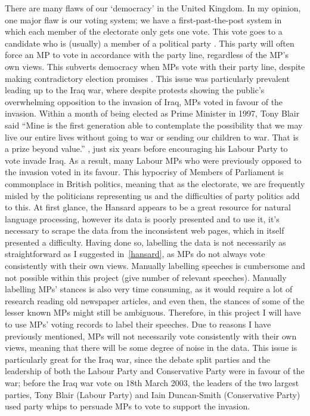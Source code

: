 \documentclass[12pt,a4paper,twoside,openright]{report}
\begin{document}
There are many flaws of our `democracy' in the United Kingdom. In my opinion, one major flaw is our voting system; we have a first-past-the-post system in which each member of the electorate only gets one vote. This vote goes to a candidate who is (usually) a member of a political party \cite{current_mp_parties}. This party will often force an MP to vote in accordance with the party line, regardless of the MP's own views. This subverts democracy when MPs vote with their party line, despite making contradictory election promises \cite{gov_tracker}. This issue was particularly prevalent leading up to the Iraq war, where despite protests \cite{iraq_protests} showing the public's overwhelming opposition to the invasion of Iraq, MPs voted in favour of the invasion. Within a month of being elected as Prime Minister in 1997, Tony Blair said ``Mine is the first generation able to contemplate the possibility that we may live our entire lives without going to war or sending our children to war. That is a prize beyond value.'' \cite{blair_quotes}, just six years before encouraging his Labour Party to vote invade Iraq. As a result, many Labour MPs who were previously opposed to the invasion voted in its favour. This hypocrisy of Members of Parliament is commonplace in British politics, meaning that as the electorate, we are frequently misled by the politicians representing us and the difficulties of party politics add to this.
\newline
\newline
At first glance, the Hansard appears to be a great resource for natural language processing, however its data is poorly presented and to use it, it's necessary to scrape the data from the inconsistent web pages, which in itself presented a difficulty. Having done so, labelling the data is not necessarily as straightforward as I suggested in~\ref{hansard}, as MPs do not always vote consistently with their own views.
\newline
\newline
Manually labelling speeches is cumbersome and not possible within this project (give number of relevant speeches). Manually labelling MPs' stances is also very time consuming, as it would require a lot of research reading old newspaper articles, and even then, the stances of some of the lesser known MPs might still be ambiguous. Therefore, in this project I will have to use MPs' voting records to label their speeches. Due to reasons I have previously mentioned, MPs will not necessarily vote consistently with their own views, meaning that there will be some degree of noise in the data. This issue is particularly great for the Iraq war, since the debate split parties and the leadership of both the Labour Party and Conservative Party were in favour of the war; before the Iraq war vote on 18th March 2003, the leaders of the two largest parties, Tony Blair (Labour Party) and Iain Duncan-Smith (Conservative Party) used party whips to persuade MPs to vote to support the invasion.
\end{document}
